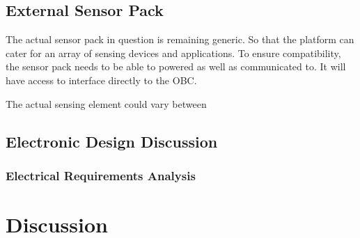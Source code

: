 		
			\subsection{External Sensor Pack}
			The actual sensor pack in question is remaining generic. So that the platform can cater for an array of sensing devices and applications. To ensure compatibility, the sensor pack needs to be able to powered as well as communicated to. It will have access to interface directly to the OBC.
			
			The actual sensing element could vary between 
		
			\subsection{Electronic Design Discussion}
				\subsubsection{Electrical Requirements Analysis}
	
	\section{Discussion}